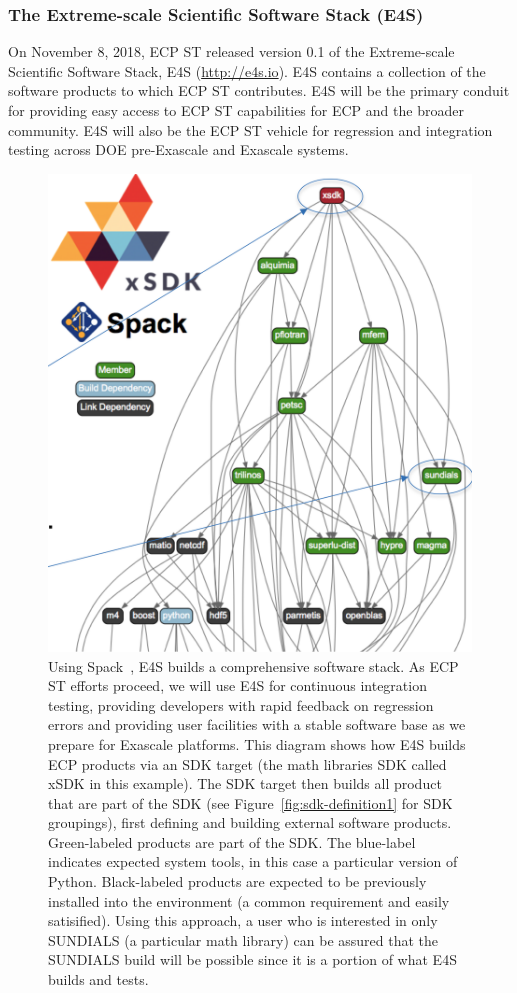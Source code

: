 \subsubsection{The Extreme-scale Scientific Software Stack (E4S)}\label{subsubsect:e4s}
On November 8, 2018, ECP ST released version 0.1 of the Extreme-scale Scientific Software Stack, E4S (\url{http://e4s.io}).  E4S contains a collection of the software products to which ECP ST contributes.  E4S will be the primary conduit for providing easy access to ECP ST capabilities for ECP and the broader community.  E4S will also be the ECP ST vehicle for regression and integration testing across DOE pre-Exascale and Exascale systems.

\begin{figure}
		\centering
		\includegraphics[scale=0.3]{E4S-Build-Tree}
	\caption{Using Spack~\cite{gamblin+:ecp18-spack-tutorial}, E4S builds a comprehensive software stack.  As ECP ST efforts proceed, we will use E4S for continuous integration testing, providing developers with rapid feedback on regression errors and providing user facilities with a stable software base as we prepare for Exascale platforms.  This diagram shows how E4S builds ECP products via an SDK target (the math libraries SDK called xSDK in this example).  The SDK target then builds all product that are part of the SDK (see Figure~\ref{fig:sdk-definition1} for SDK groupings), first defining and building external software products. Green-labeled products are part of the SDK. The blue-label indicates expected system tools, in this case a particular version of Python.  Black-labeled products are expected to be previously installed into the environment (a common requirement and easily satisified).  Using this approach, a user who is interested in only SUNDIALS (a particular math library) can be assured that the SUNDIALS build will be possible since it is a portion of what E4S builds and tests.}

\end{figure}
